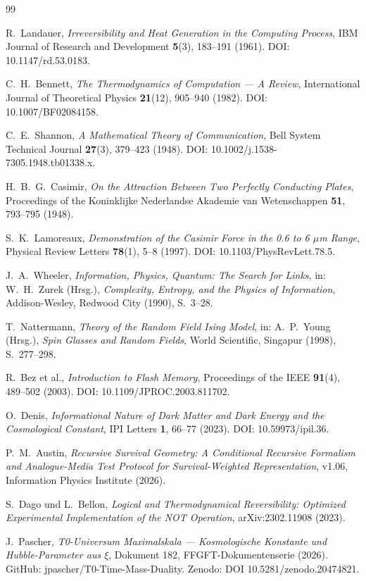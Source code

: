 \begin{thebibliography}{99}

R.~Landauer,
\textit{Irreversibility and Heat Generation in the Computing Process},
IBM Journal of Research and Development \textbf{5}(3), 183--191 (1961).
DOI: 10.1147/rd.53.0183.

C.~H.~Bennett,
\textit{The Thermodynamics of Computation — A Review},
International Journal of Theoretical Physics \textbf{21}(12), 905--940 (1982).
DOI: 10.1007/BF02084158.

C.~E.~Shannon,
\textit{A Mathematical Theory of Communication},
Bell System Technical Journal \textbf{27}(3), 379--423 (1948).
DOI: 10.1002/j.1538-7305.1948.tb01338.x.

H.~B.~G.~Casimir,
\textit{On the Attraction Between Two Perfectly Conducting Plates},
Proceedings of the Koninklijke Nederlandse Akademie van Wetenschappen
\textbf{51}, 793--795 (1948).

S.~K.~Lamoreaux,
\textit{Demonstration of the Casimir Force in the 0.6 to 6 $\mu$m Range},
Physical Review Letters \textbf{78}(1), 5--8 (1997).
DOI: 10.1103/PhysRevLett.78.5.

J.~A.~Wheeler,
\textit{Information, Physics, Quantum: The Search for Links},
in: W.~H.~Zurek (Hrsg.), \textit{Complexity, Entropy, and the Physics of
Information}, Addison-Wesley, Redwood City (1990), S.~3--28.

T.~Nattermann,
\textit{Theory of the Random Field Ising Model},
in: A.~P.~Young (Hrsg.), \textit{Spin Glasses and Random Fields},
World Scientific, Singapur (1998), S.~277--298.

R.~Bez et al.,
\textit{Introduction to Flash Memory},
Proceedings of the IEEE \textbf{91}(4), 489--502 (2003).
DOI: 10.1109/JPROC.2003.811702.

O.~Denis,
\textit{Informational Nature of Dark Matter and Dark Energy and the
Cosmological Constant},
IPI Letters \textbf{1}, 66--77 (2023).
DOI: 10.59973/ipil.36.

P.~M.~Austin,
\textit{Recursive Survival Geometry: A Conditional Recursive Formalism
and Analogue-Media Test Protocol for Survival-Weighted Representation},
v1.06, Information Physics Institute (2026).

S.~Dago und L.~Bellon,
\textit{Logical and Thermodynamical Reversibility: Optimized Experimental
Implementation of the NOT Operation},
arXiv:2302.11908 (2023).

J.~Pascher,
\textit{T0-Universum Maximalskala — Kosmologische Konstante und Hubble-Parameter
aus $\xi$},
Dokument 182, FFGFT-Dokumentenserie (2026).
GitHub: jpascher/T0-Time-Mass-Duality.
Zenodo: DOI 10.5281/zenodo.20474821.

\end{thebibliography}
